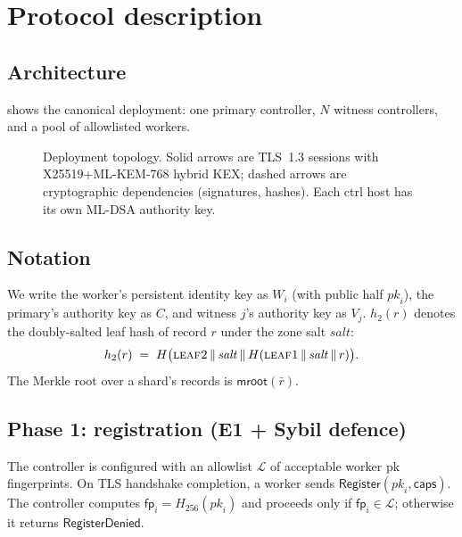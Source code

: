 \documentclass[11pt,a4paper]{article}
\theoremstyle{definition}
\theoremstyle{plain}
\newcommand{\msg}[1]{\textsf{#1}}
\newcommand{\hash}{\ensuremath{H}}
\newcommand{\concat}{\,\Vert\,}
\begin{document}
\section{Protocol description}
\label{sec:protocol}

\subsection{Architecture}

 shows the canonical deployment: one primary controller,
$N$ witness controllers, and a pool of allowlisted workers.

\begin{figure}[ht]
  \centering
  
  \caption{Deployment topology.  Solid arrows are TLS~1.3 sessions
           with X25519+ML-KEM-768 hybrid KEX; dashed arrows are
           cryptographic dependencies (signatures, hashes).
           Each ctrl host has its own ML-DSA authority key.}
  \label{fig:arch}
\end{figure}

\subsection{Notation}

We write the worker's persistent identity key as $W_i$ (with public
half $\mathit{pk}_i$), the primary's authority key as $C$, and witness
$j$'s authority key as $V_j$.  $h_2(r)$ denotes the doubly-salted leaf
hash of record $r$ under the zone salt $\mathit{salt}$:
\[
  h_2(r) \;=\; \hash\bigl(\textsc{leaf2} \concat \mathit{salt} \concat
              \hash(\textsc{leaf1} \concat \mathit{salt} \concat r)\bigr).
\]
The Merkle root over a shard's records is $\mathsf{mroot}(\bar{r})$.

\subsection{Phase 1: registration (E1 + Sybil defence)}

The controller is configured with an allowlist $\mathcal{L}$ of acceptable
worker pk fingerprints.  On TLS handshake completion, a worker sends
$\msg{Register}(\mathit{pk}_i, \mathsf{caps})$.  The controller computes
$\mathsf{fp}_i = \hash_{256}(\mathit{pk}_i)$ and proceeds only if
$\mathsf{fp}_i \in \mathcal{L}$; otherwise it returns
$\msg{RegisterDenied}$.
\end{document}
